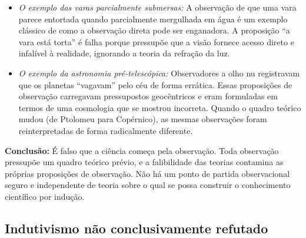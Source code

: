 \documentclass[9pt,a4paper]{extarticle}
\begin{document}
\begin{itemize}
\begin{itemize}
        \item \textit{O exemplo das varas parcialmente submersas:} A observação de que uma vara parece entortada quando parcialmente mergulhada em água é um exemplo clássico de como a observação direta pode ser enganadora. A proposição ``a vara está torta'' é falha porque pressupõe que a visão fornece acesso direto e infalível à realidade, ignorando a teoria da refração da luz.

        \item \textit{O exemplo da astronomia pré-telescópica:} Observadores a olho nu registravam que os planetas ``vagavam'' pelo céu de forma errática. Essas proposições de observação carregavam pressupostos geocêntricos e eram formuladas em termos de uma cosmologia que se mostrou incorreta. Quando o quadro teórico mudou (de Ptolomeu para Copérnico), as mesmas observações foram reinterpretadas de forma radicalmente diferente.
    \end{itemize}
\end{itemize}

\textbf{Conclusão:} É falso que a ciência começa pela observação. Toda observação pressupõe um quadro teórico prévio, e a falibilidade das teorias contamina as próprias proposições de observação. Não há um ponto de partida observacional seguro e independente de teoria sobre o qual se possa construir o conhecimento científico por indução.

\subsection{Indutivismo não conclusivamente refutado}
\end{document}

